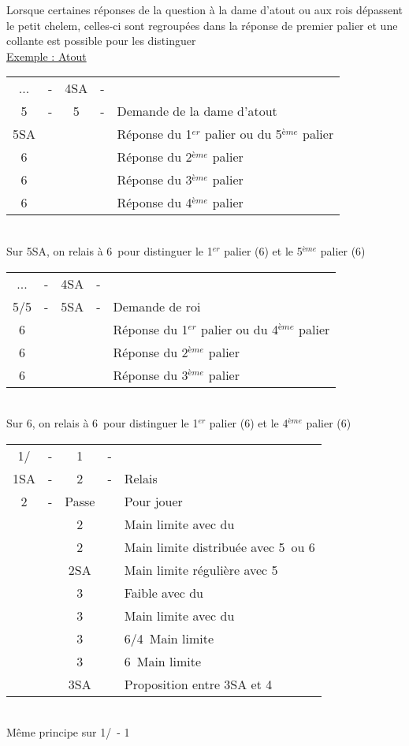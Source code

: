 \documentclass[a4paper, oneside, 11pt]{report}
\begin{document}
		Lorsque certaines réponses de la question à la dame d'atout ou aux rois dépassent le petit chelem, celles-ci sont regroupées dans la réponse de premier palier et une collante est possible pour les distinguer\\
		
		\underline{Exemple : Atout \coeur}

		\begin{tabular}{cccc|l}
		... & - & 4SA& - &\\
		5\carreau & - & 5\pique & - & Demande de la dame d'atout\\
		5SA &&&& Réponse du 1$^{er}$ palier ou du 5$^{ème}$ palier\\
		6\trefle &&&& Réponse du 2$^{ème}$ palier\\
		6\carreau &&&& Réponse du 3$^{ème}$ palier\\
		6\coeur &&&& Réponse du 4$^{ème}$ palier \\
		\end{tabular}\\
		Sur 5SA, on relais à 6\trefle\ pour distinguer le 1$^{er}$ palier (6\carreau) et le 5$^{ème}$ palier (6\coeur)\\

		\begin{tabular}{cccc|l}
		... & - & 4SA& - &\\
		5\carreau/5\pique & - & 5SA & - & Demande de roi\\
		6\trefle &&&& Réponse du 1$^{er}$ palier ou du 4$^{ème}$ palier\\
		6\carreau &&&& Réponse du 2$^{ème}$ palier\\
		6\coeur &&&& Réponse du 3$^{ème}$ palier\\
		\end{tabular}\\
		Sur 6\trefle, on relais à 6\carreau\ pour distinguer le 1$^{er}$ palier (6\coeur) et le 4$^{ème}$ palier (6\pique)\\

\newpage
	\begin{tabular}{cccc|l}
	1\trefle/\carreau & - & 1\pique & - &\\
	1SA & - & 2\trefle & - & Relais\\
	2\carreau & - & Passe && Pour jouer\\
	&& 2\coeur && Main limite avec du \trefle\\
	&& 2\pique && Main limite distribuée avec 5\pique\ ou 6\pique\\
	&& 2SA && Main limite régulière avec 5\pique\\
	&& 3\trefle && Faible avec du \trefle\\
	&& 3\carreau && Main limite avec du \carreau\\
	&& 3\coeur && 6\pique/4\coeur\ Main limite\\
	&& 3\pique && 6\pique\ Main limite\\
	&& 3SA && Proposition entre 3SA et 4\pique\\
	\end{tabular}\\
	Même principe sur 1\trefle/\carreau\ - 1\coeur\\
\end{document}
